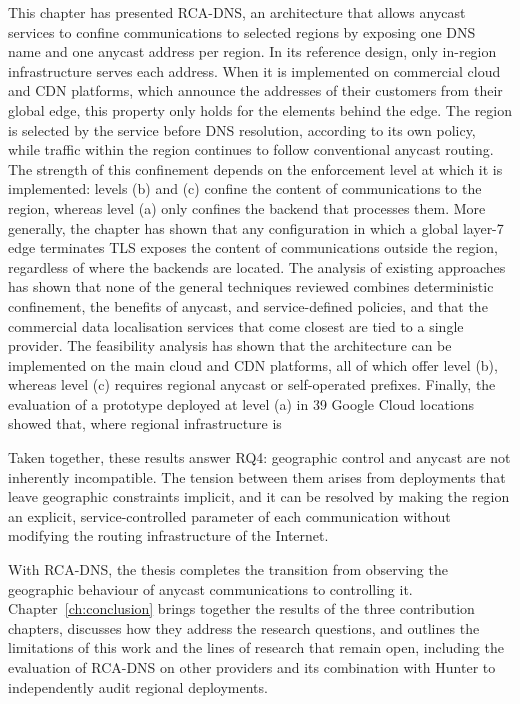This chapter has presented RCA-DNS, an architecture that allows anycast services to confine communications to selected regions by exposing one DNS name and one anycast address per region. In its reference design, only in-region infrastructure serves each address. When it is implemented on commercial cloud and CDN platforms, which announce the addresses of their customers from their global edge, this property only holds for the elements behind the edge. The region is selected by the service before DNS resolution, according to its own policy, while traffic within the region continues to follow conventional anycast routing. The strength of this confinement depends on the enforcement level at which it is implemented: levels (b) and (c) confine the content of communications to the region, whereas level (a) only confines the backend that processes them. More generally, the chapter has shown that any configuration in which a global layer-7 edge terminates TLS exposes the content of communications outside the region, regardless of where the backends are located. The analysis of existing approaches has shown that none of the general techniques reviewed combines deterministic confinement, the benefits of anycast, and service-defined policies, and that the commercial data localisation services that come closest are tied to a single provider. The feasibility analysis has shown that the architecture can be implemented on the main cloud and CDN platforms, all of which offer level (b), whereas level (c) requires regional anycast or self-operated prefixes. Finally, the evaluation of a prototype deployed at level (a) in 39 Google Cloud locations showed that, where regional infrastructure is

Taken together, these results answer RQ4: geographic control and anycast are not inherently incompatible. The tension between them arises from deployments that leave geographic constraints implicit, and it can be resolved by making the region an explicit, service-controlled parameter of each communication without modifying the routing infrastructure of the Internet. %

With RCA-DNS, the thesis completes the transition from observing the geographic behaviour of anycast communications to controlling it. Chapter~\ref{ch:conclusion} brings together the results of the three contribution chapters, discusses how they address the research questions, and outlines the limitations of this work and the lines of research that remain open, including the evaluation of RCA-DNS on other providers and its combination with Hunter to independently audit regional deployments.
